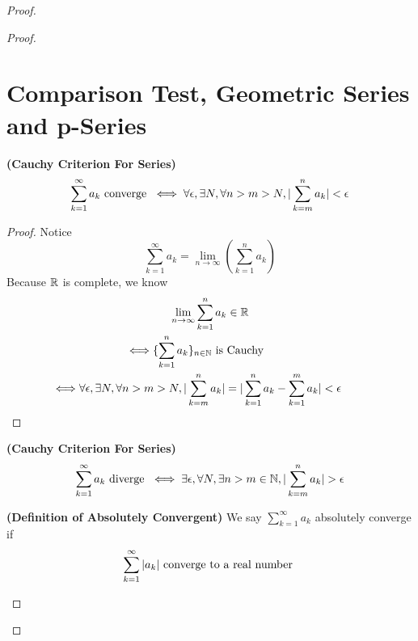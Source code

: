\documentclass{report}
\begin{document}
\begin{proof}
\begin{proof}
\section{Comparison Test, Geometric Series and p-Series}

\begin{theorem}
\label{4.3.1}
\textbf{(Cauchy Criterion For Series)} 
\begin{equation}
  \sum_{k=1}^\infty a_k\text{ converge }\iff \forall \epsilon , \exists N, \forall n>m>N, |\sum_{k=m}^n a_k|<\epsilon   
\end{equation}
\end{theorem}
\begin{proof}
Notice 
\begin{equation}
\sum_{k=1}^\infty a_k=\lim_{n\to\infty} (\sum_{k=1}^n a_k)
\end{equation}
Because $\mathbb{R}$ is complete, we know  
 \begin{gather}
\lim_{n\to\infty}\sum_{k=1}^n a_k\inr\\
\liff \set{\sum_{k=1}^n a_k}_{n\inn}\text{ is Cauchy }\\
\liff \forall \epsilon ,\exists N,\forall n>m>N, \abso{\sum_{k=m}^n a_k}=\abso{\sum_{k=1}^n a_k- \sum_{k=1}^m a_k}<\epsilon 
\end{gather}
\end{proof}
\begin{corollary}
\label{4.3.2}
\textbf{(Cauchy Criterion For Series)} 
\begin{equation}
  \sum_{k=1}^\infty a_k\text{ diverge }\iff \exists \epsilon, \forall N, \exists  n>m \inn, \abso{\sum_{k=m}^n a_k}>\epsilon 
\end{equation}
\end{corollary}
\begin{definition}
\label{4.3.3}
\textbf{(Definition of Absolutely Convergent)} We say $\sum_{k=1}^\infty a_k$ absolutely converge if 
\begin{equation}
 \sum_{k=1}^\infty |a_k| \text{ converge to a real number }
\end{equation}
\end{definition}
\begin{theorem}

\end{theorem}
\end{proof}
\end{proof}
\end{document}
